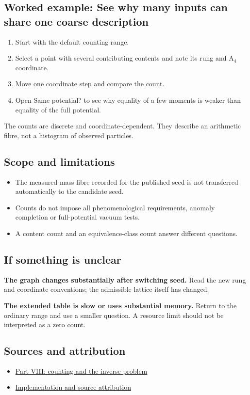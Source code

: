 \documentclass[11pt,a4paper]{article}
\begin{document}
\subsection*{Worked example: See why many inputs can share one coarse description}
\begin{enumerate}
\item Start with the default counting range.
\item Select a point with several contributing contents and note its rung and A\ensuremath{{}_{4}} coordinate.
\item Move one coordinate step and compare the count.
\item Open Same potential? to see why equality of a few moments is weaker than equality of the full potential.
\end{enumerate}
The counts are discrete and coordinate-dependent. They describe an arithmetic fibre, not a histogram of observed particles.
\subsection*{Scope and limitations}
\begin{itemize}
\item The measured-mass fibre recorded for the published seed is not transferred automatically to the candidate seed.
\item Counts do not impose all phenomenological requirements, anomaly completion or full-potential vacuum tests.
\item A content count and an equivalence-class count answer different questions.
\end{itemize}
\subsection*{If something is unclear}
\textbf{The graph changes substantially after switching seed.} Read the new rung and coordinate conventions; the admissible lattice itself has changed.

\textbf{The extended table is slow or uses substantial memory.} Return to the ordinary range and use a smaller question. A resource limit should not be interpreted as a zero count.

\subsection*{Sources and attribution}
\begin{itemize}
\item \href{https://karlesmarin.github.io/ghu-explorer/papers/part-viii/index.html}{Part VIII: counting and the inverse problem}
\item \href{https://github.com/karlesmarin/ghu-lab/blob/main/src/sections/census_section.js}{Implementation and source attribution}
\end{itemize}
\end{document}
